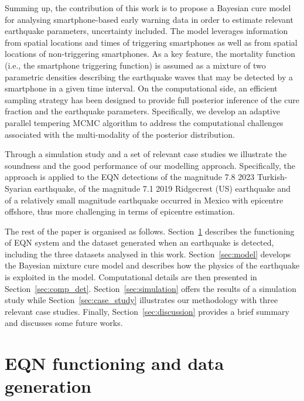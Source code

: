 \documentclass[final]{statsoc}
\begin{document}
 Summing up, the contribution of this work is to propose a Bayesian cure model for analysing smartphone-based early warning data in order to estimate relevant earthquake parameters, uncertainty included. The model leverages information from spatial locations and times of triggering smartphones as well as from spatial locations of non-triggering smartphones. As a key feature, the mortality function (i.e., the smartphone triggering function) is assumed as a mixture of two parametric densities describing the earthquake waves that may be detected by a smartphone in a given time interval.  
On the computational side, an efficient sampling strategy has been designed to provide full posterior inference of the cure fraction and the earthquake parameters. Specifically, we develop an adaptive parallel tempering MCMC algorithm to address the computational challenges associated with the multi-modality of the posterior distribution. 

Through a simulation study and a set of relevant case studies we illustrate the soundness and the good performance of our modelling approach. Specifically, the approach is applied to the EQN detections of the magnitude 7.8 2023 Turkish-Syarian earthquake, of the magnitude 7.1 2019 Ridgecrest (US) earthquake and of a relatively small magnitude earthquake occurred in Mexico with epicentre offshore, thus more challenging in terms of epicentre estimation.

The rest of the paper is organised as follows. Section~\ref{sec:EQN} describes the functioning of EQN system and the dataset generated when an earthquake is detected, including the three datasets analysed in this work.
Section~\ref{sec:model} develops the Bayesian mixture cure  model and describes how the physics of the earthquake is exploited 
in the model. Computational details are then presented in Section~\ref{sec:comp_det}.  Section~\ref{sec:simulation} offers the results of a simulation study while Section~\ref{sec:case_study} illustrates our methodology with three relevant case studies.
Finally, Section~\ref{sec:discussion} provides a brief summary and discusses some future works.

\section{EQN functioning and data generation}\label{sec:EQN}
\end{document}
